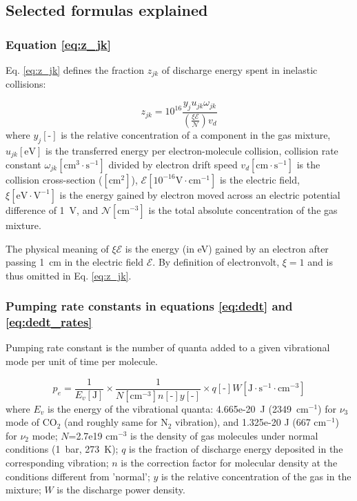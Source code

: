 \documentclass{report}
\begin{document}
\begin{appendices}
\chapter{Selected formulas explained}
\label{appendix:formulas_explained}


\subsection*{Equation \ref{eq:z_jk}}

Eq. \ref{eq:z_jk} defines the fraction $z_{jk}$ of discharge energy spent in inelastic collisions:

\begin{equation*}
z_{jk} = 10^{16} \frac{y_j u_{jk} \omega _{jk}} {\left( \frac{\xi\mathcal{E}}{\mathcal{N}} \right) v_d}  
\end{equation*}
where $y_j[\text{-}]$ is the relative concentration of a component in the gas mixture, $u_{jk}[\text{eV}]$ is the transferred energy per electron-molecule collision, collision rate constant $\omega _{jk}[\text{cm}^3\cdot\text{s}^{-1}]$ divided by electron drift speed $v_d[\text{cm}\cdot\text{s}^{-1}]$ is the collision cross-section ($[\text{cm}^2]$), $\mathcal{E}[10^{-16}\text{V}\cdot\text{cm}^{-1}]$ is the electric field, $\xi[\text{eV}\cdot\text{V}^{-1}]$ is the energy gained by electron moved across an electric potential difference of 1~V,  and $\mathcal{N}[\text{cm}^{-3}]$ is the total absolute concentration of the gas mixture.

The physical meaning of $\xi\mathcal{E}$ is the energy (in eV) gained by an electron after passing 1~cm in the electric field $\mathcal{E}$. By definition of electronvolt, $\xi = 1$ and is thus omitted in Eq. \ref{eq:z_jk}.



\subsection*{Pumping rate constants in equations \ref{eq:dedt} and \ref{eq:dedt_rates}}

Pumping rate constant is the number of quanta added to a given vibrational mode per unit of time per molecule.

\begin{equation*}
p_e = \frac{1}{E_v[\text{J}]} \times \frac{1}{N[\text{cm}^{-3}] n[\text{-}] y[\text{-}]} \times q[\text{-}] W[\text{J}\cdot \text{s}^{-1} \cdot \text{cm}^{-3}]
\end{equation*}
where $E_v$ is the energy of the vibrational quanta: 4.665e-20~J (2349~{cm$^{-1}$}) for $\nu_3$ mode of {CO$_2$} (and roughly same for {N$_2$} vibration), and  1.325e-20 J (667 {cm$^{-1}$}) for $\nu_2$ mode; $N$=2.7e19 {cm$^{-3}$} is the density of gas molecules under normal conditions (1~bar, 273~K); $q$ is the fraction of discharge energy deposited in the corresponding vibration; $n$ is the correction factor for molecular density at the conditions different from 'normal'; $y$ is the relative concentration of the gas in the mixture; $W$ is the discharge power density.


\end{appendices}
\end{document}
